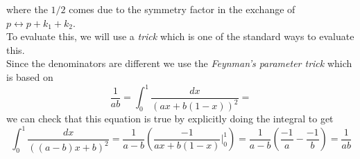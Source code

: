 \documentclass[11pt, notitlepage]{report}
\numberwithin{equation}{section}
\begin{document}
where the \(1/2\) comes due to the symmetry factor in the exchange of \(p\leftrightarrow p+k_1+k_2\).\\
To evaluate this, we will use a \textit{trick} which is one of the standard ways to evaluate this.\\
Since the denominators are different we use the \textit{Feynman's parameter trick} which is based on
\begin{equation*}
    \frac{1}{ab} = \int_0^1 \frac{dx}{(ax + b(1-x))^2} =  
\end{equation*}
we can check that this equation is true by explicitly doing the integral to get 
\begin{equation*}
    \int_0^1 \frac{dx}{((a-b)x + b)^2} = \frac{1}{a-b} \left(\frac{-1}{ax + b(1-x)}\bigg|_0^1 \right) = \frac{1}{a-b}\left( \frac{-1}{a} - \frac{-1}{b}  \right) = \frac{1}{ab}
\end{equation*}
\end{document}
